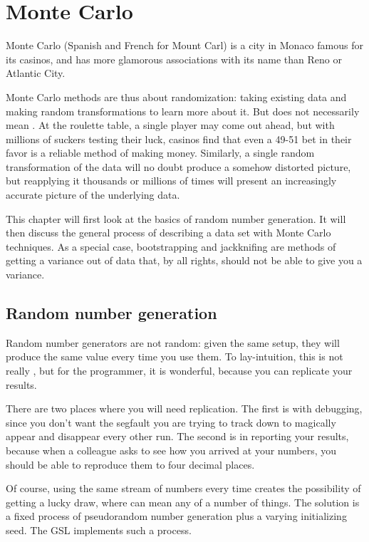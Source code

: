 \chapter{Monte Carlo} \label{boot} 

Monte Carlo (Spanish and French for Mount Carl) is a city in Monaco
famous for its casinos, and has more glamorous associations with its name
than Reno or Atlantic City.

Monte Carlo methods are thus about randomization: taking existing data
and making random transformations to learn more about it. But
 does not necessarily mean .
At the
roulette table, a single player may come out ahead, but with millions of
suckers testing their luck, casinos find that even a 49-51 bet in their
favor is a reliable method of
making money.  Similarly, a single random transformation of the data will
no doubt produce a somehow distorted picture, but reapplying it thousands
or millions of times will present an increasingly accurate picture of
the underlying data.

This chapter will first look at the basics of random number generation.
It will then discuss the general process of describing a data set with
Monte Carlo techniques.  As a special case,
bootstrapping and jackknifing are methods of getting a variance out of
data that, by all rights, should not be able to give you a variance. 

\section{Random number generation}\label{randomnumbers}
Random number generators are not random: given the same setup, they
will produce the same value every time you use them. To lay-intuition,
this is not really , but for the programmer, it is wonderful,
because you can replicate your results.

There are two places where you will need replication. The first is with
debugging, since you don't want the segfault you are trying to track
down to magically appear and disappear every other run. The second is
in reporting your results, because when a colleague asks to see how you
arrived at your numbers, you should be able to reproduce them to four
decimal places.

Of course, using the same stream of numbers every time creates the
possibility of getting a lucky draw, where  can mean any of a
number of things. The solution is a fixed process of pseudorandom
number generation plus a varying initializing seed. The GSL implements
such a process.


